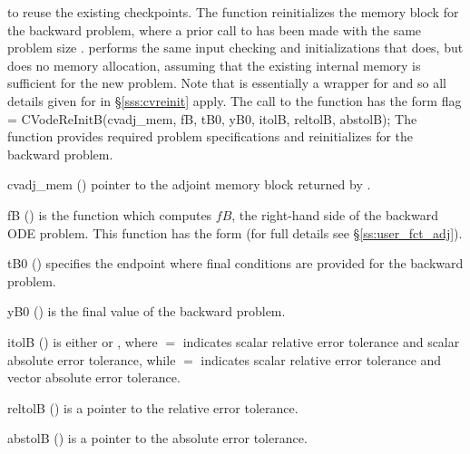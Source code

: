 to reuse the existing checkpoints. The function  reinitializes
the {\cvodes} memory block for the backward problem, where a prior call to
 has been made with the same problem size .
 performs the same input checking and initializations that 
 does, but does no memory allocation, 
assuming that the existing internal memory is sufficient for the new problem. 
Note that  is essentially a wrapper for 
and so all details given for  in \S\ref{sss:cvreinit}
apply.
The call to the  function has the form
{
  flag = CVodeReInitB(cvadj\_mem, fB, tB0, yB0, itolB, reltolB, abstolB);
}
{
  The function  provides required problem specifications 
  and reinitializes {\cvodes} for the backward problem.
}
{
  \begin{args}
  \item[cvadj\_mem] ()
    pointer to the adjoint memory block returned by .
  \item[fB] ()
    is the {\C} function which computes $fB$, the right-hand side of the 
    backward ODE problem. This function has the form 
     (for full details see \S\ref{ss:user_fct_adj}).
  \item[tB0] ()
    specifies the endpoint where final conditions are provided for the 
    backward problem.
  \item[yB0] ()
    is the final value of the backward problem. 
  \item[itolB] () 
    is either  or , where $=$ indicates scalar relative error 
    tolerance and scalar absolute error tolerance, while $=$ indicates scalar
    relative error tolerance and vector absolute error tolerance. 
  \item[reltolB] ()
    is a pointer to the relative error tolerance.
  \item[abstolB] ()
    is a pointer to the absolute error tolerance.
  \end{args}
}
